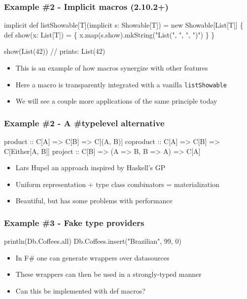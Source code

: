 \documentclass[svgnames,hyperref={bookmarks=false}]{beamer}
\begin{document}
\begin{frame}[fragile]
\frametitle{Example \#2 - Implicit macros (2.10.2+)}

\begin{semiverbatim}
implicit def listShowable[T](implicit s: Showable[T]) =
  new Showable[List[T]] \{
    def show(x: List[T]) = \{
      x.map(s.show).mkString("List(", ", ", ")")
  \}
\}

show(List(42))
// prints: List(42)

\end{semiverbatim}

\begin{itemize}
\item This is an example of how macros synergize with other features
\item Here a macro is transparently integrated with a vanilla \texttt{listShowable}
\item We will see a couple more applications of the same principle today
\end{itemize}
\end{frame}

\begin{frame}[fragile]
\frametitle{Example \#2 - A \#typelevel alternative}

\begin{semiverbatim}
product   :: C[A] => C[B] => C[(A, B)]
coproduct :: C[A] => C[B] => C[Either[A, B]]
project   :: C[B] => (A => B, B => A) => C[A]

\end{semiverbatim}

\begin{itemize}
\item Lars Hupel  an approach inspired by Haskell's GP
\item Uniform representation + type class combinators = materialization
\item Beautiful, but has some problems with performance
\end{itemize}
\end{frame}

\begin{frame}[fragile]
\frametitle{Example \#3 - Fake type providers}

\begin{semiverbatim}
println(Db.Coffees.all)
Db.Coffees.insert("Brazilian", 99, 0)

\end{semiverbatim}

\begin{itemize}
\item In F\# one can generate wrappers over datasources
\item These wrappers can then be used in a strongly-typed manner
\item Can this be implemented with def macros?
\end{itemize}
\end{frame}
\end{document}
